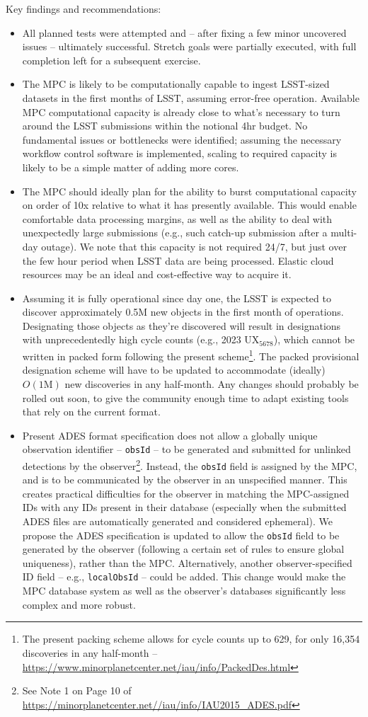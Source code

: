 Key findings and recommendations:
\begin{itemize}
	\item All planned tests were attempted and -- after fixing a few minor uncovered issues -- ultimately successful. Stretch goals were partially executed, with full completion left for a subsequent exercise.
	\item The MPC is likely to be computationally capable to ingest LSST-sized datasets in the first months of LSST, assuming error-free operation. Available MPC computational capacity is already close to what's necessary to turn around the LSST submissions within the notional 4hr budget. No fundamental issues or bottlenecks were identified; assuming the necessary workflow control software is implemented, scaling to required capacity is likely to be a simple matter of adding more cores.
	\item The MPC should ideally plan for the ability to burst computational capacity on order of 10x relative to what it has presently available. This would enable comfortable data processing margins, as well as the ability to deal with unexpectedly large submissions (e.g., such catch-up submission after a multi-day outage). We note that this capacity is not required 24/7, but just over the few hour period when LSST data are being processed. Elastic cloud resources may be an ideal and cost-effective way to acquire it.
	\item Assuming it is fully operational since day one, the LSST is expected to discover approximately 0.5M new objects in the first month of operations. Designating those objects as they're discovered will result in designations with unprecedentedly high cycle counts (e.g., 2023 UX$_{5678}$), which cannot be written in packed form following the present scheme\footnote{The present packing scheme allows for cycle counts up to 629, for only 16,354 discoveries in any half-month -- \url{https://www.minorplanetcenter.net/iau/info/PackedDes.html}}. The packed provisional designation scheme will have to be updated to accommodate (ideally) $O(1\mathrm{M})$ new discoveries in any half-month. Any changes should probably be rolled out soon, to give the community enough time to adapt existing tools that rely on the current format.
	\item Present ADES format specification does not allow a globally unique observation identifier -- {\tt obsId} -- to be generated and submitted for unlinked detections by the observer\footnote{See Note 1 on Page 10 of \url{https://minorplanetcenter.net//iau/info/IAU2015_ADES.pdf}}. Instead, the {\tt obsId} field is assigned by the MPC, and is to be communicated by the observer in an unspecified manner. This creates practical difficulties for the observer in matching the MPC-assigned IDs with any IDs present in their database (especially when the submitted ADES files are automatically generated and considered ephemeral). We propose the ADES specification is updated to allow the {\tt obsId} field to be generated by the observer (following a certain set of rules to ensure global uniqueness), rather than the MPC. Alternatively, another observer-specified ID field -- e.g., {\tt localObsId} -- could be added. This change would make the MPC database system as well as the observer's databases significantly less complex and more robust.

\end{itemize}

